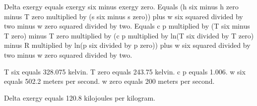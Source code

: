 Delta exergy equals exergy six minus exergy zero.  
Equals (h six minus h zero minus T zero multiplied by (s six minus s zero)) plus w six squared divided by two minus w zero squared divided by two.  
Equals c p multiplied by (T six minus T zero) minus T zero multiplied by (c p multiplied by ln(T six divided by T zero) minus R multiplied by ln(p six divided by p zero)) plus w six squared divided by two minus w zero squared divided by two.  

T six equals 328.075 kelvin.  
T zero equals 243.75 kelvin.  
c p equals 1.006.  
w six equals 502.2 meters per second.  
w zero equals 200 meters per second.  

Delta exergy equals 120.8 kilojoules per kilogram.